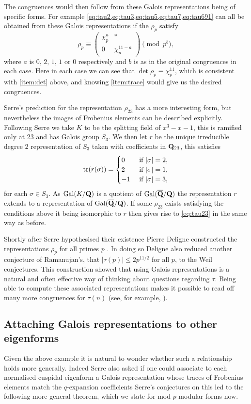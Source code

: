\documentclass[a4paper,12pt]{article}
\begin{document}
\begin{ex}
The congruences would then follow from these Galois representations being of specific forms.
For example \cref{eq:tau2,eq:tau3,eq:tau5,eq:tau7,eq:tau691} can all be obtained from these Galois representations if the $\rho_p$ satisfy
\[
\rho_p \equiv \begin{pmatrix}
\chi_p^a & * \\
0        & \chi_p^{11-a}
\end{pmatrix}\pmod{p^b},
\]
where $a$ is $0,\,2,\,1,\,1$ or $0$ respectively and $b$ is as in the original congruences in each case.
Here in each case we can see that $\det\rho_p \equiv \chi_p^{11}$, which is consistent with \cref{item:det} above, and knowing \cref{item:trace} would give us the desired congruences.

Serre's prediction for the representation $\rho_{23}$ has a more interesting form, but nevertheless the images of Frobenius elements can be described explicitly.
Following Serre we take $K$ to be the splitting field of $x^3 - x - 1$, this is ramified only at 23 and has Galois group $S_3$.
We then let $r$ be the unique irreducible degree 2 representation of $S_3$ taken with coefficients in $\mathbf{Q}_{23}$, this satisfies
\[
\operatorname{tr}(r(\sigma)) = \begin{cases}
0 &\text{ if } |\sigma| = 2,\\
2 &\text{ if } |\sigma| = 1,\\
-1 &\text{ if } |\sigma| = 3,
\end{cases}
\]
for each $\sigma \in S_3$.
As $\operatorname{Gal}(K/\mathbf{Q})$ is a quotient of $\operatorname{Gal}(\overline{\mathbf{Q}}/\mathbf{Q})$ the representation $r$ extends to a representation of $\operatorname{Gal}(\overline{\mathbf{Q}}/\mathbf{Q})$.
If some $\rho_{23}$ exists satisfying the conditions above it being isomorphic to $r$ then gives rise to \cref{eq:tau23} in the same way as before.

Shortly after Serre hypothesised their existence Pierre Deligne constructed the representations $\rho_p$ for all primes $p$  \cite{Deligne}.
In doing so Deligne also reduced another conjecture of Ramanujan's, that $|\tau(p)| \le 2p^{11/2}$ for all $p$, to the Weil conjectures.
This construction showed that using Galois representations is a natural and often effective way of thinking about questions regarding $\tau$.
Being able to compute these associated representations makes it possible to read off many more congruences for $\tau(n)$ (see, for example, \cite{Mascot}).
\end{ex}

\subsection{Attaching Galois representations to other eigenforms}
Given the above example it is natural to wonder whether such a relationship holds more generally.
Indeed Serre also asked if one could associate to each normalised cuspidal eigenform a Galois representation whose traces of Frobenius elements match the $q$-expansion coefficients
Serre's conjectures on this led to the following more general theorem, which we state for mod $p$ modular forms now.
\end{document}
